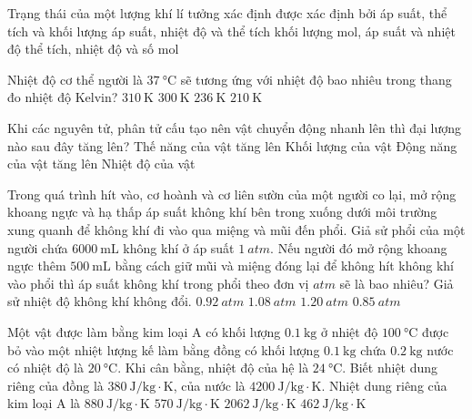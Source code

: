 \begin{ex}
Trạng thái của một lượng khí lí tưởng xác định được xác định bởi	
	\choice
	{áp suất, thể tích và khối lượng}
	{\True áp suất, nhiệt độ và thể tích}
	{khối lượng mol, áp suất và nhiệt độ}
	{thể tích, nhiệt độ và số mol}
	\loigiai{}
\end{ex}
\begin{ex}
	Nhiệt độ cơ thể người là $\SI{37}{\celsius}$ sẽ tương ứng với nhiệt độ bao nhiêu trong thang đo nhiệt độ Kelvin?
	\choice
	{\True $\SI{310}{\kelvin}$}
	{$\SI{300}{\kelvin}$}
	{$\SI{236}{\kelvin}$}
	{$\SI{210}{\kelvin}$}
	\loigiai{}
\end{ex}
\begin{ex}
	Khi các nguyên tử, phân tử cấu tạo nên vật chuyển động nhanh lên thì đại lượng nào sau đây tăng lên?
	\choice
	{Thế năng của vật tăng lên}
	{Khối lượng của vật}
	{Động năng của vật tăng lên}
	{\True Nhiệt độ của vật}
	\loigiai{}
\end{ex}
\begin{ex}
	Trong quá trình hít vào, cơ hoành và cơ liên sườn của một người co lại, mở rộng khoang ngực và hạ thấp áp suất không khí bên trong xuống dưới môi trường xung quanh để không khí đi vào qua miệng và mũi đến phổi. Giả sử phổi của một người chứa $\SI{6000}{\milli\liter}$ không khí ở áp suất $\SI{1}{atm}$. Nếu người đó mở rộng khoang ngực thêm $\SI{500}{\milli\liter}$ bằng cách giữ mũi và miệng đóng lại để không hít không khí vào phổi thì áp suất không khí trong phổi theo đơn vị $\si{atm}$ sẽ là bao nhiêu? Giả sử nhiệt độ không khí không đổi.
	\choice
	{\True $\SI{0.92}{atm}$}
	{$\SI{1.08}{atm}$}
	{$\SI{1.20}{atm}$}
	{$\SI{0.85}{atm}$}
\end{ex}
\begin{ex}
	Một vật được làm bằng kim loại A có khối lượng $\SI{0.1}{\kilogram}$ ở nhiệt độ $\SI{100}{\celsius}$ được bỏ vào một nhiệt lượng kế làm bằng đồng có khối lượng $\SI{0.1}{\kilogram}$ chứa $\SI{0.2}{\kilogram}$ nước có nhiệt độ là $\SI{20}{\celsius}$. Khi cân bằng, nhiệt độ của hệ là $\SI{24}{\celsius}$. Biết nhiệt dung riêng của đồng là $\SI{380}{\joule/\kilogram\cdot\kelvin}$, của nước là $\SI{4200}{\joule/\kilogram\cdot\kelvin}$. Nhiệt dung riêng của kim loại A là
	\choice
	{$\SI{880}{\joule/\kilogram\cdot\kelvin}$}
	{$\SI{570}{\joule/\kilogram\cdot\kelvin}$}
	{$\SI{2062}{\joule/\kilogram\cdot\kelvin}$}
	{\True $\SI{462}{\joule/\kilogram\cdot\kelvin}$}
\end{ex}
